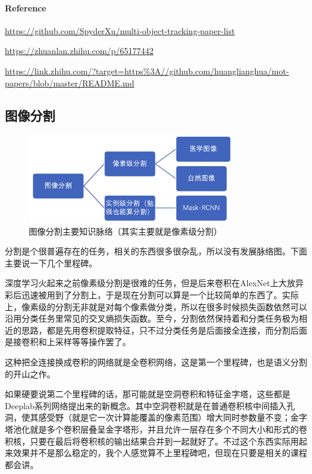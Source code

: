 \documentclass[lang=cn,11pt,a4paper]{eleganttemplate}
\begin{document}
\paragraph{Reference} 
\begin{enumerate}[label={[\arabic*]}, noitemsep]
\item \href{https://github.com/SpyderXu/multi-object-tracking-paper-list}{https://github.com/SpyderXu/multi-object-tracking-paper-list} 
\item \href{https://zhuanlan.zhihu.com/p/65177442}{https://zhuanlan.zhihu.com/p/65177442} 
\item \href{https://link.zhihu.com/?target=https\%3A//github.com/huanglianghua/mot-papers/blob/master/README.md}{https://link.zhihu.com/?target=https\%3A//github.com/huanglianghua/mot-papers/blob/master/README.md} 
\end{enumerate}

\subsection{图像分割}
\begin{figure}[htbp]
  \centering
  \includegraphics[width=0.8\textwidth]{image/cv_7.png}
  \caption{图像分割主要知识脉络（其实主要就是像素级分割）}
\end{figure}
分割是个很普遍存在的任务，相关的东西很多很杂乱，所以没有发展脉络图。下面主要说一下几个里程碑。

深度学习火起来之前像素级分割是很难的任务，但是后来卷积在AlexNet上大放异彩后迅速被用到了分割上，于是现在分割可以算是一个比较简单的东西了。实际上，像素级的分割无非就是对每个像素做分类，所以在很多时候损失函数依然可以沿用分类任务里常见的交叉熵损失函数。至今，分割依然保持着和分类任务极为相近的思路，都是先用卷积提取特征，只不过分类任务是后面接全连接，而分割后面是接卷积和上采样等等操作罢了。

这种把全连接换成卷积的网络就是全卷积网络，这是第一个里程碑，也是语义分割的开山之作。

\hfill

如果硬要说第二个里程碑的话，那可能就是空洞卷积和特征金字塔，这些都是Deeplab系列网络提出来的新概念。其中空洞卷积就是在普通卷积核中间插入孔洞，使其感受野（就是它一次计算能覆盖的像素范围）增大同时参数量不变；金字塔池化就是多个卷积层叠呈金字塔形，并且允许一层存在多个不同大小和形式的卷积核，只要在最后将卷积核的输出结果合并到一起就好了。不过这个东西实际用起来效果并不是那么稳定的，我个人感觉算不上里程碑吧，但现在只要是相关的课程都会讲。
\end{document}
